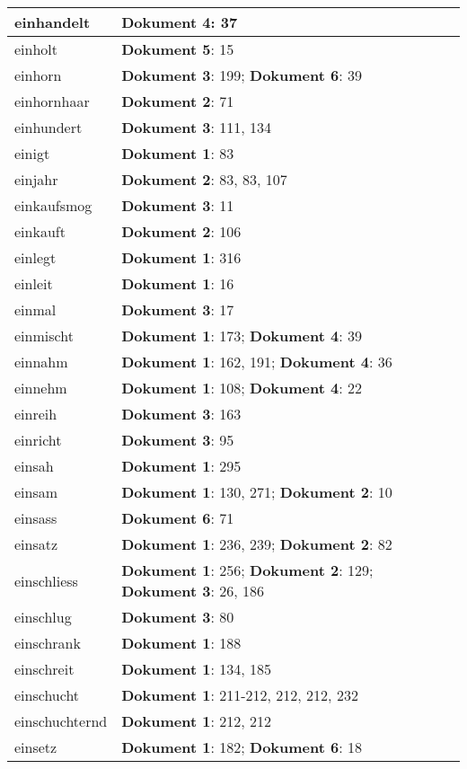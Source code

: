 \documentclass[a5paper]{article}
\begin{document}
\begin{longtable}[l]{|l|p{3in}|}
\hline
einhandelt & \textbf{Dokument 4}: 37 \\
\hline
einholt & \textbf{Dokument 5}: 15 \\
\hline
einhorn & \textbf{Dokument 3}: 199; \textbf{Dokument 6}: 39 \\
\hline
einhornhaar & \textbf{Dokument 2}: 71 \\
\hline
einhundert & \textbf{Dokument 3}: 111, 134 \\
\hline
einigt & \textbf{Dokument 1}: 83 \\
\hline
einjahr & \textbf{Dokument 2}: 83, 83, 107 \\
\hline
einkaufsmog & \textbf{Dokument 3}: 11 \\
\hline
einkauft & \textbf{Dokument 2}: 106 \\
\hline
einlegt & \textbf{Dokument 1}: 316 \\
\hline
einleit & \textbf{Dokument 1}: 16 \\
\hline
einmal & \textbf{Dokument 3}: 17 \\
\hline
einmischt & \textbf{Dokument 1}: 173; \textbf{Dokument 4}: 39 \\
\hline
einnahm & \textbf{Dokument 1}: 162, 191; \textbf{Dokument 4}: 36 \\
\hline
einnehm & \textbf{Dokument 1}: 108; \textbf{Dokument 4}: 22 \\
\hline
einreih & \textbf{Dokument 3}: 163 \\
\hline
einricht & \textbf{Dokument 3}: 95 \\
\hline
einsah & \textbf{Dokument 1}: 295 \\
\hline
einsam & \textbf{Dokument 1}: 130, 271; \textbf{Dokument 2}: 10 \\
\hline
einsass & \textbf{Dokument 6}: 71 \\
\hline
einsatz & \textbf{Dokument 1}: 236, 239; \textbf{Dokument 2}: 82 \\
\hline
einschliess & \textbf{Dokument 1}: 256; \textbf{Dokument 2}: 129; \textbf{Dokument 3}: 26, 186 \\
\hline
einschlug & \textbf{Dokument 3}: 80 \\
\hline
einschrank & \textbf{Dokument 1}: 188 \\
\hline
einschreit & \textbf{Dokument 1}: 134, 185 \\
\hline
einschucht & \textbf{Dokument 1}: 211-212, 212, 212, 232 \\
\hline
einschuchternd & \textbf{Dokument 1}: 212, 212 \\
\hline
einsetz & \textbf{Dokument 1}: 182; \textbf{Dokument 6}: 18 \\

\end{longtable}
\end{document}
